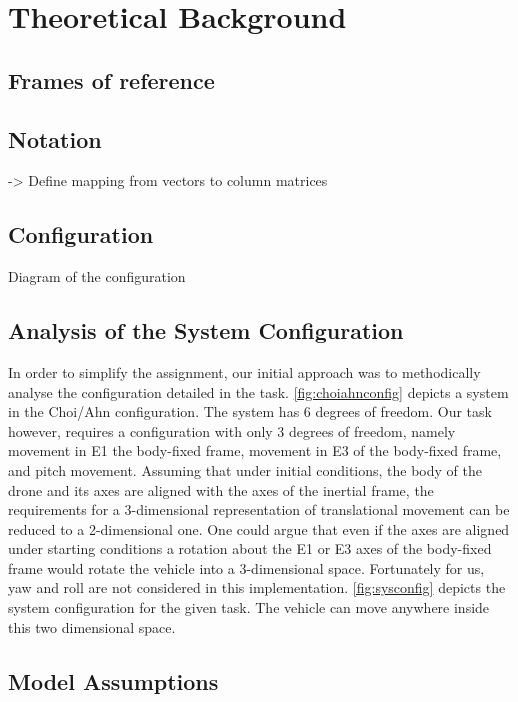 \section{Theoretical Background}

\subsection{Frames of reference}

\subsection{Notation} %
-> Define mapping from vectors to column matrices
\subsection{Configuration}
Diagram of the configuration

\subsection{Analysis of the System Configuration}\label{s:analysis}
\label{fig:sysconfig}
\label{fig:choiahnconfig}
In order to simplify the assignment, our initial approach was to methodically analyse the configuration detailed in the task.
\cref{fig:choiahnconfig} depicts a system in the Choi/Ahn configuration. The system has 6 degrees of freedom. Our task however, requires a configuration with only 3 degrees of freedom, namely movement in E1 the body-fixed frame, movement in E3 of the body-fixed frame, and pitch movement.
Assuming that under initial conditions, the body of the drone and its axes are aligned with the axes of the inertial frame, the requirements for a 3-dimensional representation of translational movement can be reduced to a 2-dimensional one. One could argue that even if the axes are aligned under starting conditions a rotation about the E1 or E3 axes of the body-fixed frame would rotate the vehicle into a 3-dimensional space. Fortunately for us, yaw and roll are not considered in this implementation.
\cref{fig:sysconfig} depicts the system configuration for the given task. The vehicle can move anywhere inside this two dimensional space.

\subsection{Model Assumptions}\label{s:modassumptions}

